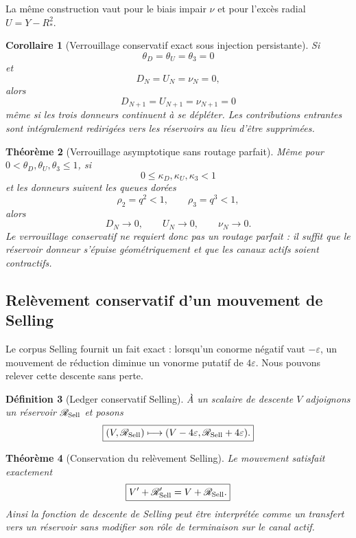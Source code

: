 \documentclass[11pt,a4paper]{article}
\newtheorem{theorem}{Théorème}[section]
\newtheorem{corollary}[theorem]{Corollaire}
\newtheorem{definition}[theorem]{Définition}
\begin{document}
La même construction vaut pour le biais impair $\nu$ et pour l'excès radial $U=Y-R_*^2$.

\begin{corollary}[Verrouillage conservatif exact sous injection persistante]\label{cor:v11-exact-lock}
Si
\[
 \theta_D=\theta_U=\theta_3=0
\]
et
\[
 D_N=U_N=\nu_N=0,
\]
alors
\[
 \boxed{D_{N+1}=U_{N+1}=\nu_{N+1}=0}
\]
même si les trois donneurs continuent à se dépléter. Les contributions entrantes sont intégralement redirigées vers les réservoirs au lieu d'être supprimées.
\end{corollary}

\begin{theorem}[Verrouillage asymptotique sans routage parfait]\label{thm:v11-asymptotic-lock}
Même pour $0<\theta_D,\theta_U,\theta_3\le1$, si
\[
 0\le\kappa_D,\kappa_U,\kappa_3<1
\]
et les donneurs suivent les queues dorées
\[
 \rho_2=q^2<1,\qquad \rho_3=q^3<1,
\]
alors
\[
 D_N\to0,\qquad U_N\to0,\qquad \nu_N\to0.
\]
Le verrouillage conservatif ne requiert donc pas un routage parfait : il suffit que le réservoir donneur s'épuise géométriquement et que les canaux actifs soient contractifs.
\end{theorem}

\subsection{Relèvement conservatif d'un mouvement de Selling}

Le corpus Selling fournit un fait exact : lorsqu'un conorme négatif vaut $-\varepsilon$, un mouvement de réduction diminue un vonorme putatif de $4\varepsilon$. Nous pouvons relever cette descente sans perte.

\begin{definition}[Ledger conservatif Selling]\label{def:v11-selling-ledger}
À un scalaire de descente $V$ adjoignons un réservoir $\mathscr R_{\rm Sell}$ et posons
\[
 \boxed{
 (V,\mathscr R_{\rm Sell})
 \longmapsto
 (V-4\varepsilon,\mathscr R_{\rm Sell}+4\varepsilon).}
\]
\end{definition}

\begin{theorem}[Conservation du relèvement Selling]\label{thm:v11-selling-conservation}
Le mouvement satisfait exactement
\[
 \boxed{
 V'+\mathscr R_{\rm Sell}'
 =
 V+\mathscr R_{\rm Sell}.}
\]
Ainsi la fonction de descente de Selling peut être interprétée comme un transfert vers un réservoir sans modifier son rôle de terminaison sur le canal actif.
\end{theorem}
\end{document}
